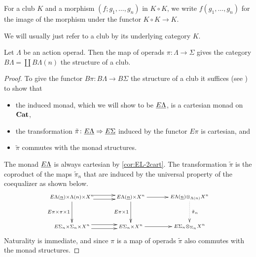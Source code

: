 \begin{nota}\label{nota:clubmult}
For a club $K$ and a morphism $(f; g_{1}, \ldots, g_{n})$ in $K \circ K$, we write $f(g_{1}, \ldots, g_{n})$ for the image of the morphism under the functor $K \circ K \rightarrow K$.
\end{nota}

We will usually just refer to a club by its underlying category $K$.


\begin{thm}
Let $\Lambda$ be an action operad. Then the map of operads $\pi \colon \Lambda \rightarrow \Sigma$ gives the category $B\Lambda = \coprod B\Lambda(n)$ the structure of a club.
\end{thm}
\begin{proof}


To give the functor $B\pi \colon B\Lambda \rightarrow B \Sigma$ the structure of a club it suffices (see \cite{leinster}) to show that
\begin{itemize}
\item the induced monad, which we will show to be $\underline{E\Lambda}$, is a cartesian monad on $\mathbf{Cat}$,
\item the transformation $\tilde{\pi} \colon \underline{E\Lambda} \Rightarrow \underline{E\Sigma}$ induced by the functor $E\pi$ is cartesian, and
\item $\tilde{\pi}$ commutes with the monad structures.
\end{itemize}
The monad $\underline{E\Lambda}$ is always cartesian by \cref{cor:EL-2cart}. The transformation $\tilde{\pi}$ is the coproduct of the maps $\tilde{\pi}_{n}$ that are induced by the universal property of the coequalizer as shown below.
  \[
    \xy
      (0,0)*+{\scriptstyle \ELn \times \Lambda(n) \times X^n} ="00";
      (0,-15)*+{\scriptstyle E\Sigma_{n} \times \Sigma_{n} \times X^n} ="01";
      (30,0)*+{\scriptstyle \ELn \times X^n} ="10";
      (30,-15)*+{\scriptstyle E\Sigma_{n} \times X^n} ="11";
      (60,0)*+{\scriptstyle \ELn \otimes_{\Lambda(n)} X^n} ="20";
      (60,-15)*+{\scriptstyle E\Sigma_{n} \otimes_{\Sigma_{n}}  X^n} ="21";
      {\ar (11,1)*{}; (22,1)*{} };
      {\ar (11,-1)*{}; (22,-1)*{} };
      {\ar_{E\pi \times \pi \times 1} "00" ; "01"};
      {\ar (10,-14)*{}; (23,-14)*{} };
      {\ar (10,-16)*{}; (23,-16)*{} };
      {\ar_{E\pi \times 1} "10" ; "11"};
      {\ar@{.>}^{\tilde{\pi}_{n}} "20" ; "21"};
      {\ar "10" ; "20"};
      {\ar "11" ; "21"};
    \endxy
  \]
Naturality is immediate, and since $\pi$ is a map of operads $\tilde{\pi}$ also commutes with the monad structures.


\end{proof}
